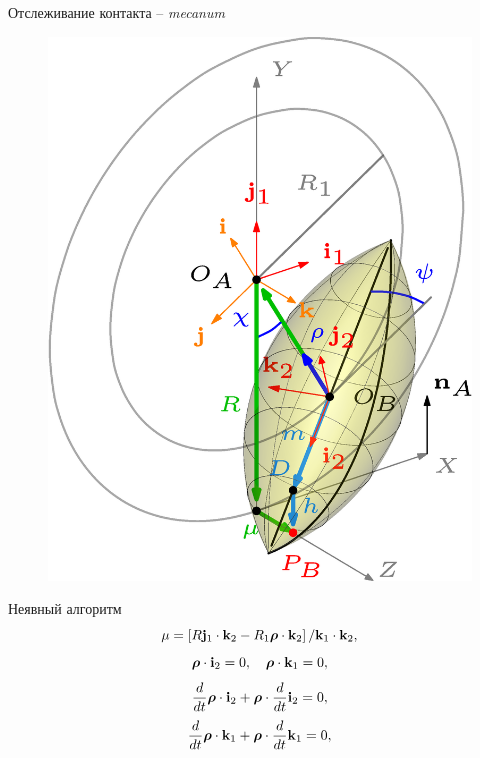 \documentclass{beamer}
\begin{document}
\begin{frame}{Отслеживание контакта -- \textit{mecanum}}
        \begin{figure}[htb]
            \centering\includegraphics[width=\textwidth]{content/pic/asy/pic_mecanum.png}
            \label{ContactScheme}
        \end{figure}
    \endminipage
    \quad
        Неявный алгоритм
        $$
        \mu =\left[R{\bf j}_1\cdot{\bf k}_2-R_1{\boldsymbol{\mathbf{\rho}} }\cdot {\bf k}_2\right] /
        {\bf k}_1\cdot{\bf k}_2,
        $$
        $$
        \boldsymbol{\mathbf{\rho}}\cdot {\bf i}_2=0,\quad\boldsymbol{\mathbf{\rho}}\cdot {\bf k}_1=0,
        $$
        $$
        \dfrac{d}{dt}\boldsymbol{\mathbf{\rho}}\cdot {\bf i}_2+\boldsymbol{\mathbf{\rho}}\cdot\dfrac{d}{dt}{\bf i}_2=0,
        $$
        $$
        \dfrac{d}{dt}\boldsymbol{\mathbf{\rho}}\cdot {\bf k}_1+\boldsymbol{\mathbf{\rho}}\cdot\dfrac{d}{dt}{\bf k}_1=0,
        $$
    \endminipage
\end{frame}
\end{document}
